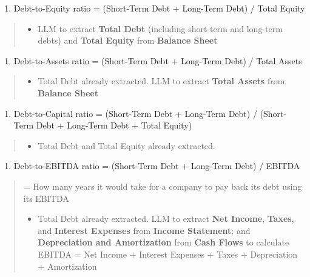 \documentclass[12pt,a4paper]{article}
\begin{document}
\begin{enumerate}
\def\labelenumi{\arabic{enumi}.}
\setcounter{enumi}{2}
\item
  Debt-to-Equity ratio = (Short-Term Debt + Long-Term Debt) / Total
  Equity
\end{enumerate}

\begin{quote}
\begin{itemize}
\item
  LLM to extract \textbf{Total Debt} (including short-term and long-term
  debts) and \textbf{Total Equity} from \textbf{Balance Sheet}
\end{itemize}
\end{quote}

\begin{enumerate}
\def\labelenumi{\arabic{enumi}.}
\setcounter{enumi}{3}
\item
  Debt-to-Assets ratio = (Short-Term Debt + Long-Term Debt) / Total
  Assets
\end{enumerate}

\begin{quote}
\begin{itemize}
\item
  Total Debt already extracted. LLM to extract \textbf{Total Assets}
  from \textbf{Balance Sheet}
\end{itemize}
\end{quote}

\begin{enumerate}
\def\labelenumi{\arabic{enumi}.}
\setcounter{enumi}{4}
\item
  Debt-to-Capital ratio = (Short-Term Debt + Long-Term Debt) /
  (Short-Term Debt + Long-Term Debt + Total Equity)
\end{enumerate}

\begin{quote}
\begin{itemize}
\item
  Total Debt and Total Equity already extracted.
\end{itemize}
\end{quote}

\begin{enumerate}
\def\labelenumi{\arabic{enumi}.}
\setcounter{enumi}{5}
\item
  Debt-to-EBITDA ratio = (Short-Term Debt + Long-Term Debt) / EBITDA
\end{enumerate}

\begin{quote}
= How many years it would take for a company to pay back its debt using
its EBITDA

\begin{itemize}
\item
  Total Debt already extracted. LLM to extract \textbf{Net Income},
  \textbf{Taxes}, and \textbf{Interest Expenses} from \textbf{Income
  Statement}; and \textbf{Depreciation and Amortization} from
  \textbf{Cash Flows} to calculate EBITDA = Net Income + Interest
  Expenses + Taxes + Depreciation + Amortization
\end{itemize}
\end{quote}
\end{document}
